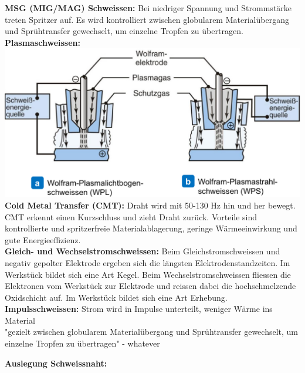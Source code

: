 \textbf{MSG (MIG/MAG) Schweissen:} Bei niedriger Spannung und Strommstärke 
treten Spritzer auf. Es wird kontrolliert zwischen globularem Materialübergang 
und Sprühtransfer gewechselt, um einzelne Tropfen zu übertragen. \\

\textbf{Plasmaschweissen:}\\
\includegraphics[width=0.8\linewidth]{src/images/WP.jpeg}\\

\textbf{Cold Metal Transfer (CMT):} Draht wird mit 50-130 Hz hin und 
her bewegt. CMT erkennt einen Kurzschluss und zieht Draht zurück. 
Vorteile sind kontrollierte und spritzerfreie Materialablagerung, 
geringe Wärmeeinwirkung und gute Energieeffizienz.\\

\textbf{Gleich- und Wechselstromschweissen:} Beim Gleichstromschweissen 
und negativ gepolter Elektrode ergeben sich die längsten 
Elektrodenstandzeiten. Im Werkstück bildet sich eine Art Kegel. 
Beim Wechselstromschweissen fliessen die Elektronen vom Werkstück 
zur Elektrode und reissen dabei die hochschmelzende Oxidschicht auf. 
Im Werkstück bildet sich eine Art Erhebung.\\

\textbf{Impulsschweissen:} Strom wird in Impulse unterteilt, weniger Wärme ins Material\\
"gezielt zwischen
globularem Materialübergang und Sprühtransfer
gewechselt, um einzelne Tropfen zu übertragen" - whatever\\
\vfill \null \columnbreak

\textbf{Auslegung Schweissnaht:}\\


